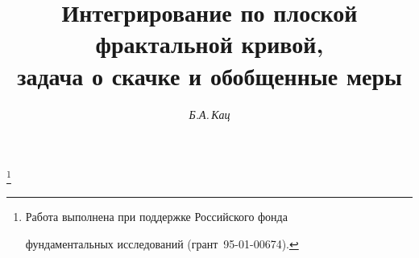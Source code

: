

  




  


\newcommand{\intl}{\int\limits}  


\newcommand{\supp}{\operatorname{supp}}  


\newcommand{\dist}{\operatorname{dist}}  


\newcommand{\conv}{\operatorname{conv}}  


\newcommand{\myfrac}[2]{\frac{\partial #1}{\partial #2}}  


\newcommand{\tts}[1]{}  


  




   


\setcounter{page}{53}  












\author{\it Б.А.\,Кац}  




\title{Интегрирование по плоской фрактальной кривой,\\  


задача о скачке и обобщенные меры}  


  


\thanks{Работа выполнена при поддержке Российского фонда  


фундаментальных исследований (грант \No\,95-01-00674).}  


\date{}  


